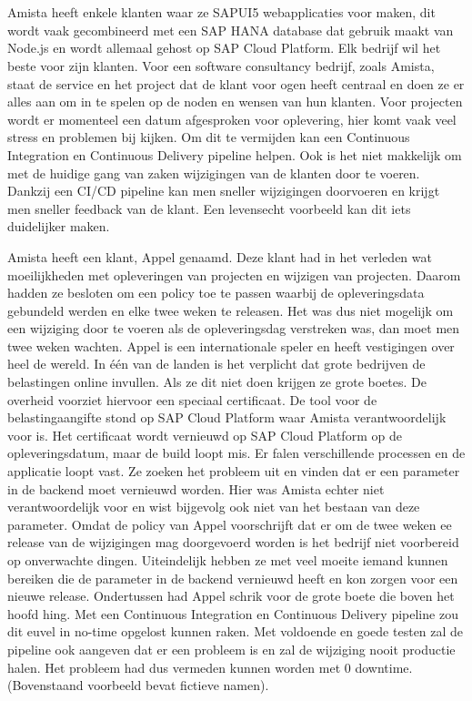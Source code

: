 \section{}
\label{sec:probleemstelling}

Amista heeft enkele klanten waar ze SAPUI5 webapplicaties voor maken, dit wordt vaak gecombineerd met een SAP HANA database dat gebruik maakt van Node.js en wordt allemaal gehost op SAP Cloud Platform.
Elk bedrijf wil het beste voor zijn klanten. Voor een software consultancy bedrijf, zoals Amista, staat de service en het project dat de klant voor ogen heeft centraal en doen ze er alles aan om in te spelen op de noden en wensen van hun klanten.
Voor projecten wordt er momenteel een datum afgesproken voor oplevering, hier komt vaak veel stress en problemen bij kijken. Om dit te vermijden kan een Continuous Integration en Continuous Delivery pipeline helpen. Ook is het niet makkelijk om met de huidige gang van zaken wijzigingen van de klanten door te voeren. Dankzij een CI/CD pipeline kan men sneller wijzigingen doorvoeren en krijgt men sneller feedback van de klant.
Een levensecht voorbeeld kan dit iets duidelijker maken.

\newline{}Amista heeft een klant, Appel genaamd. Deze klant had in het verleden wat moeilijkheden met opleveringen van projecten en wijzigen van projecten. Daarom hadden ze besloten om een policy toe te passen waarbij de opleveringsdata gebundeld werden en elke twee weken te releasen. Het was dus niet mogelijk om een wijziging door te voeren als de opleveringsdag verstreken was, dan moet men twee weken wachten. 
Appel is een internationale speler en heeft vestigingen over heel de wereld. In één van de landen is het verplicht dat grote bedrijven de belastingen online invullen. Als ze dit niet doen krijgen ze grote boetes. De overheid voorziet hiervoor een speciaal certificaat. De tool voor de belastingaangifte stond op SAP Cloud Platform waar Amista verantwoordelijk voor is. Het certificaat wordt vernieuwd op SAP Cloud Platform op de opleveringsdatum, maar de build loopt mis. Er falen verschillende processen en de applicatie loopt vast. Ze zoeken het probleem uit en vinden dat er een parameter in de backend moet vernieuwd worden. Hier was Amista echter niet verantwoordelijk voor en wist bijgevolg ook niet van het bestaan van deze parameter. Omdat de policy van Appel voorschrijft dat er om de twee weken ee release van de wijzigingen mag doorgevoerd worden is het bedrijf niet voorbereid op onverwachte dingen. Uiteindelijk hebben ze met veel moeite iemand kunnen bereiken die de parameter in de backend vernieuwd heeft en kon zorgen voor een nieuwe release. Ondertussen  had Appel schrik voor de grote boete die boven het hoofd hing.
Met een Continuous Integration en Continuous Delivery pipeline zou dit euvel in no-time opgelost kunnen raken. Met voldoende en goede testen zal de pipeline ook aangeven dat er een probleem is en zal de wijziging nooit productie halen. Het probleem had dus vermeden kunnen worden met 0 downtime.
(Bovenstaand voorbeeld bevat fictieve namen).

